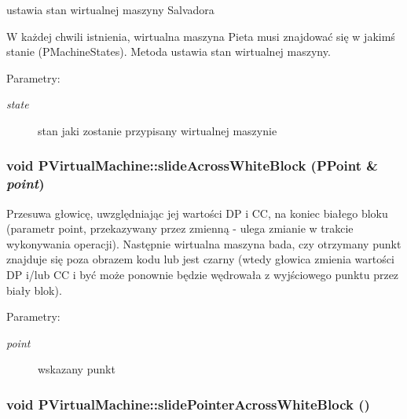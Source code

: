ustawia stan wirtualnej maszyny Salvadora 

W każdej chwili istnienia, wirtualna maszyna Pieta musi znajdować się w jakimś stanie (PMachineStates). Metoda ustawia stan wirtualnej maszyny. \begin{Desc}
\item[Parametry:]
\begin{description}
\item[{\em state}]stan jaki zostanie przypisany wirtualnej maszynie \end{description}
\end{Desc}
\hypertarget{classPVirtualMachine_4b2ebb998393324c5240dc48fdb14f3a}{
\subsubsection[{slideAcrossWhiteBlock}]{\setlength{\rightskip}{0pt plus 5cm}void PVirtualMachine::slideAcrossWhiteBlock ({\bf PPoint} \& {\em point})}}
\label{classPVirtualMachine_4b2ebb998393324c5240dc48fdb14f3a}


Przesuwa głowicę, uwzględniając jej wartości DP i CC, na koniec białego bloku (parametr point, przekazywany przez zmienną - ulega zmianie w trakcie wykonywania operacji). Następnie wirtualna maszyna bada, czy otrzymany punkt znajduje się poza obrazem kodu lub jest czarny (wtedy głowica zmienia wartości DP i/lub CC i być może ponownie będzie wędrowała z wyjściowego punktu przez biały blok). \begin{Desc}
\item[Parametry:]
\begin{description}
\item[{\em point}]wskazany punkt \end{description}
\end{Desc}
\hypertarget{classPVirtualMachine_e37d4dfa512c3dd97b9958f013ffb7b3}{
\subsubsection[{slidePointerAcrossWhiteBlock}]{\setlength{\rightskip}{0pt plus 5cm}void PVirtualMachine::slidePointerAcrossWhiteBlock ()}}
\label{classPVirtualMachine_e37d4dfa512c3dd97b9958f013ffb7b3}


